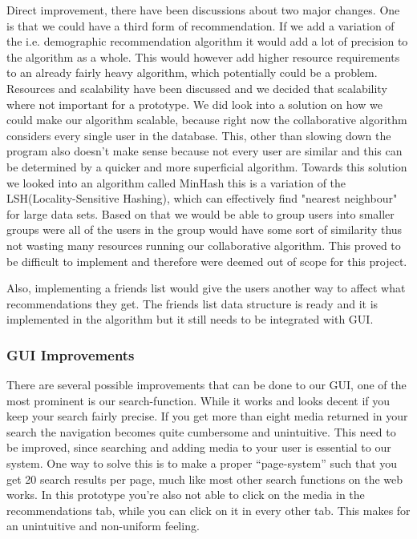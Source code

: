 Direct improvement, there have been discussions about two major changes. One is that we could have a third form of recommendation. If we add a variation of the i.e. demographic recommendation algorithm it would add a lot of precision to the algorithm as a whole. This would however add higher resource requirements to an already fairly heavy algorithm, which potentially could be a problem. 
Resources and scalability have been discussed and we decided that scalability where not important for a prototype. We did look into a solution on how we could make our algorithm scalable, because right now the collaborative algorithm considers every single user in the database. This, other than slowing down the program also doesn't make sense because not every user are similar and this can be determined by a quicker and more superficial algorithm. Towards this solution we looked into an algorithm called MinHash this is a variation of the LSH(Locality-Sensitive Hashing), which can effectively find "nearest neighbour" for large data sets. Based on that we would be able to group users into smaller groups were all of the users in the group would have some sort of similarity thus not wasting many resources running our collaborative algorithm. This proved to be difficult to implement and therefore were deemed out of scope for this project.

Also, implementing a friends list would give the users another way to affect what recommendations they get. The friends list data structure is ready and it is implemented in the algorithm but it still needs to be integrated with GUI.

\subsubsection{GUI Improvements}
There are several possible improvements that can be done to our GUI, one of the most prominent is our search-function. While it works and looks decent if you keep your search fairly precise. If you get more than eight media returned in your search the navigation becomes quite cumbersome and unintuitive. This need to be improved, since searching and adding media to your user is essential to our system. One way to solve this is to make a proper “page-system” such that you get 20 search results per page, much like most other search functions on the web works.
In this prototype you're also not able to click on the media in the recommendations tab, while you can click on it in every other tab. This makes for an unintuitive and non-uniform feeling.

